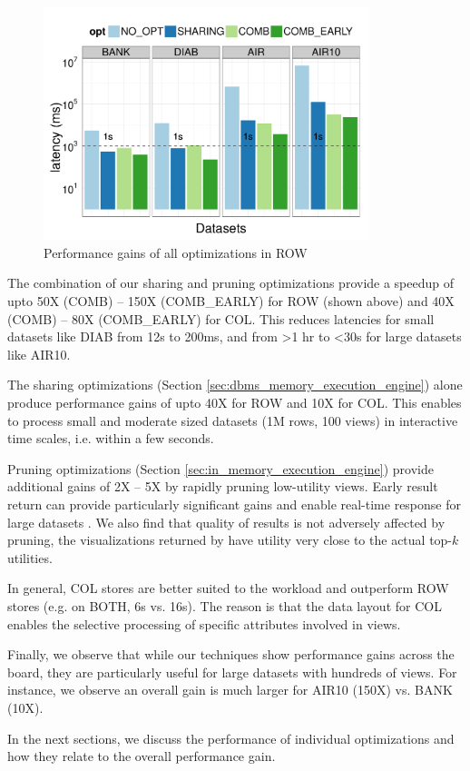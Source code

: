 \begin{figure}[h]
	\centering
	\includegraphics[width=9.5cm] {Images/all_opt_real_data_row.pdf}
	\caption{Performance gains of all optimizations in ROW}
	\label{fig:share_prune_row}
	\vspace{-15pt}
\end{figure}

\begin{denselist} 
\item The combination of our sharing and pruning optimizations provide a speedup of upto 50X (COMB) -- 150X (COMB\_EARLY) for ROW (shown above) and 40X (COMB) -- 80X (COMB\_EARLY) for COL.
This reduces latencies for small datasets like DIAB from 12s to 200ms, and from >1 hr to <30s for large datasets like AIR10.
\item The sharing optimizations (Section \ref{sec:dbms_memory_execution_engine}) alone produce performance gains of upto 40X for ROW and 10X for COL. This enables \SeeDB to process small and moderate sized datasets (1M rows, 100 views) in interactive time scales, i.e. within a few seconds.
\item Pruning optimizations (Section \ref{sec:in_memory_execution_engine}) provide additional gains of 2X -- 5X by rapidly pruning low-utility views. Early result return can provide particularly significant gains and enable real-time response for large datasets . We also find that quality of results is not adversely affected by pruning, the visualizations returned by \SeeDB have utility very close to the actual top-$k$ utilities.
\item In general, COL stores are better suited to the \SeeDB workload and outperform ROW stores (e.g. on BOTH, 6s vs. 16s). The reason is that the data layout for COL enables the selective processing of specific attributes involved in views. 
\item Finally, we observe that while our techniques show performance gains across the board, they are particularly useful for large datasets with hundreds of views. For instance, we observe an overall gain is much larger for AIR10 (150X) vs. BANK (10X).
\end{denselist}

In the next sections, we discuss the performance of individual optimizations and how they relate to the overall performance gain.



